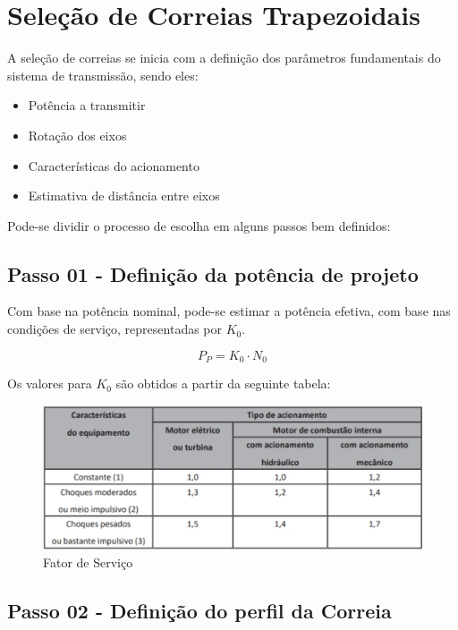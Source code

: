 

\chapter{Seleção de Correias Trapezoidais}


A seleção de correias se inicia com a definição dos parâmetros fundamentais do sistema de transmissão, sendo eles:

\begin{itemize}
    \item Potência a transmitir
    \item Rotação dos eixos
    \item Características do acionamento
    \item Estimativa de distância entre eixos
\end{itemize}

Pode-se dividir o processo de escolha em alguns passos bem definidos:

\section{Passo 01 - Definição da potência de projeto}

Com base na potência nominal, pode-se estimar a potência efetiva, com base nas condições de serviço, representadas por ${K_0}$.

\begin{equation}
    P_P=K_0\cdot N_0 \label{9.24}
\end{equation}

Os valores para ${K_0}$ são obtidos a partir da seguinte tabela:

\begin{figure}[h]
	\centering
	\caption{Fator de Serviço}
    \label{k0_tabela}
	\includegraphics[scale=0.4]{Imagens/K0.png}
\end{figure}

\newpage
\section{Passo 02 - Definição do perfil da Correia}

